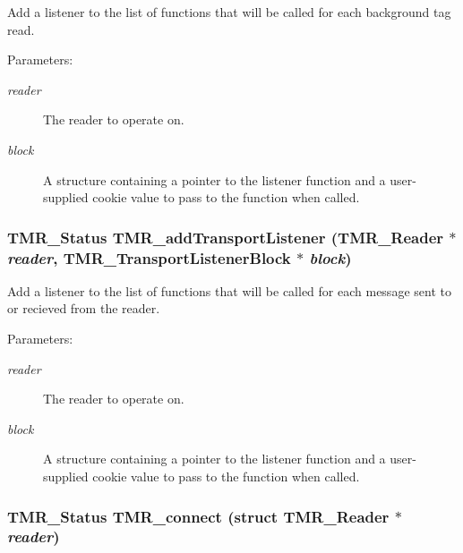 Add a listener to the list of functions that will be called for each background tag read.

\begin{Desc}
\item[Parameters:]
\begin{description}
\item[{\em reader}]The reader to operate on. \item[{\em block}]A structure containing a pointer to the listener function and a user-supplied cookie value to pass to the function when called. \end{description}
\end{Desc}
\hypertarget{group__reader_gf1a35a5a75818801532ec51992123018}{
\subsubsection[{TMR\_\-addTransportListener}]{\setlength{\rightskip}{0pt plus 5cm}TMR\_\-Status TMR\_\-addTransportListener ({\bf TMR\_\-Reader} $\ast$ {\em reader}, \/  {\bf TMR\_\-TransportListenerBlock} $\ast$ {\em block})}}
\label{group__reader_gf1a35a5a75818801532ec51992123018}


Add a listener to the list of functions that will be called for each message sent to or recieved from the reader.

\begin{Desc}
\item[Parameters:]
\begin{description}
\item[{\em reader}]The reader to operate on. \item[{\em block}]A structure containing a pointer to the listener function and a user-supplied cookie value to pass to the function when called. \end{description}
\end{Desc}
\hypertarget{group__reader_gf4d6e37515b6206807f60e2d21ca1e52}{
\subsubsection[{TMR\_\-connect}]{\setlength{\rightskip}{0pt plus 5cm}TMR\_\-Status TMR\_\-connect (struct {\bf TMR\_\-Reader} $\ast$ {\em reader})}}
\label{group__reader_gf4d6e37515b6206807f60e2d21ca1e52}


